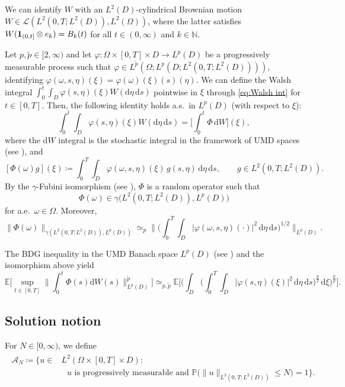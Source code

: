\documentclass[10pt,a4paper]{amsart}
\numberwithin{equation}{section}
\newcommand{\N}{\mathbb{N}}
\newcommand{\ceqq}{\coloneqq}
\newcommand{\col}{\colon}
\newcommand{\E}{{\mathbb E}}
\renewcommand{\P}{{\mathbb P}}
\newcommand{\Om}{\Omega}
\newcommand{\om}{\omega}
\newcommand{\A}{{\mathcal A}}
\newcommand{\calL}{\mathcal{L}}
\newcommand{\dd}{\,\mathrm{d}}
\newcommand{\one}{{{\bf 1}}}
\newcommand{\ddd}{\mathrm{d}}
\begin{document}
We can identify $W$ with an $L^2(D)$-cylindrical Brownian motion $W\in \calL(L^2(0,T;L^2(D)),L^2(\Om))$, where the latter satisfies $W(\one_{(0,t]}\otimes e_k)= B_k(t)$ for all $t\in(0,\infty)$ and $k\in\N$. 

Let $p,\tilde p\in[2,\infty)$ and let $\varphi\col \Om\times[0,T]\times D \to L^p(D)$ be a progressively measurable process such that $\varphi \in L^{\tilde p}(\Omega; L^p(D; L^2(0,T; L^2(D))))$, identifying $\varphi(\om,s,\eta)(\xi)=\varphi(\om)(\xi)(s)(\eta)$.  
We can define the Walsh integral $\int_0^t\int_D\varphi(s,\eta)(\xi)W(\ddd \eta\dd s)$ pointwise in $\xi$ through \eqref{eq:Walsh int} for $t\in[0,T]$. 
Then, the following identity holds a.s.\ in $L^p(D)$ (with respect to $\xi$): 
\[
\int_0^t\int_D\varphi(s,\eta)(\xi)W(\ddd \eta\dd s) =  
\Big[\int_0^t \Phi\dd W\Big](\xi),
\]
where the $\ddd W$ integral is the stochastic integral in the framework of UMD spaces (see \cite{NVW15}), and    
\[
[\Phi(\omega)g](\xi)
\coloneqq
\int_0^T \int_D
\varphi(\om,s,\eta)(\xi)\,g(s,\eta)
\dd \eta\dd s,
\qquad
g\in L^2(0,T;L^2(D)).
\]
By the $\gamma$-Fubini isomorphism (see \cite[(3.1), (3.2)]{NVW15}), $\Phi$ is a random operator such that
\[
\Phi(\omega)
\in
\gamma\bigl(L^2(0,T;L^2(D)),L^p(D)\bigr) 
\] 
for a.e.\ $\om\in\Om$. 
Moreover,
\[
\|\Phi(\omega)\|_{\gamma(L^2(0,T;L^2(D)),L^p(D))}
\simeq_p
\bigg\|
\Big(
\int_0^T \int_D
|\varphi(\om,s,\eta)(\cdot)|^2
\dd \eta\dd s
\Big)^{1/2}
\bigg\|_{L^p(D)}.
\]


The BDG inequality in the  UMD Banach space $L^p(D)$ (see \cite[(5.5)]{NVW15}) and the isomorphism above yield  
\begin{equation}\label{eq:BDG Lp}
 \E \Big[ \sup_{t \in [0,T]} \Big\| \int_0^t \Phi(s)\mathrm{d}W(s) \Big\|_{L^p(D)}^{\tilde p} \Big] \simeq_{p,\tilde p} \E\Big[ \Big(\int_D \Big( \int_0^T \int_D |\varphi(s, \eta)(\xi)|^2 \dd\eta \dd s \Big)^{\frac{p}{2}} \dd \xi\Big)^{\frac{\tilde p}{p}} \Big].
\end{equation} 
 

\subsection{Solution notion}

For $N\in[0,\infty)$, we define
\begin{align}\label{eq:AN}
\begin{split}
\A_N\ceqq \big\{u\in& L^2(\Om\times [0,T]\times D): \\
&\text{ $u$ is progressively measurable and } \P\big(\|u\|_{L^2(0,T;L^2(D))}\leq N\big)=1\big\}. 
\end{split}
\end{align}
\end{document}
